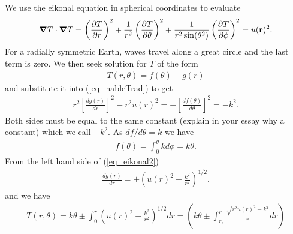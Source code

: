 \documentclass{mm2}
\newcommand{\bnabla}{\boldsymbol{\nabla}}
\begin{document}
We use the eikonal equation in spherical coordinates to evaluate
\begin{equation}
\bnabla T\cdot \bnabla T= \left(\frac{\partial T}{\partial r}\right)^2
+ \frac{1}{r^2} \left(\frac{\partial T}{\partial \theta}\right)^2
+ \frac{1}{r^2\sin(\theta^2)} \left(\frac{\partial T}{\partial \phi}\right)^2
=u({\bf r})^2.
\label{eq_nableTrad}
\end{equation}
For a radially symmetric Earth, waves travel along a great circle and the last 
term is zero. We then seek solution for $T$ of the form 
\begin{eqnarray}
T(r,\theta) = f(\theta)+g(r)
\label{eq_Tansatz}
\end{eqnarray}
and substitute it into (\ref{eq_nableTrad}) to get
\begin{eqnarray}
r^2\left[\frac{d g(r)}{dr}\right]^2-r^2 u(r)^2 = 
-\left[\frac{d f(\theta)}{d\theta}\right]^2 = -k^2.
\label{eq_eikonal2}
\end{eqnarray}
Both sides must be equal to the same constant (explain in your essay why a
constant)
which we call $-k^2$. 
As $df/d\theta=k$ we have
\begin{eqnarray}
f(\theta) = \int_0^\theta k d\phi = k\theta. 
\label{eq_eikonal_theta}
\end{eqnarray}
From the left hand side of (\ref{eq_eikonal2}) 
\begin{eqnarray}
\frac{d g(r)}{dr}= \pm \left(u(r)^2 -\frac{k^2}{r^2}\right)^{1/2}.
\label{eq_eikonal_g}
\end{eqnarray}
and we have
\begin{eqnarray}
T(r,\theta) = k\theta \pm \int_0^r \left(u(r)^2 -\frac{k^2}{r^2}\right)^{1/2} dr = \left( k\theta \pm \int_{r_s}^r \frac{\sqrt{r^2 u(r)^2 -k^2}}{r} dr \right)
\label{eq_Tansatz2} 
\end{eqnarray}
\end{document}
